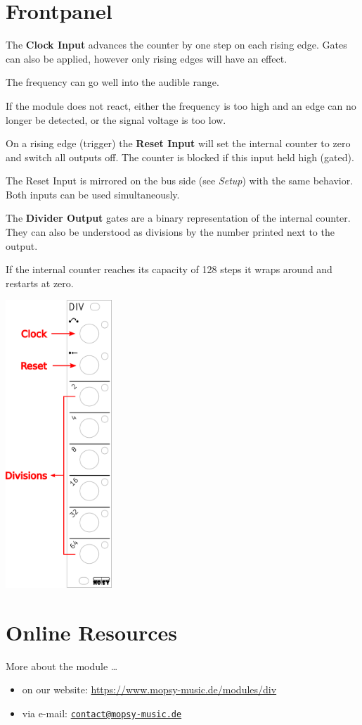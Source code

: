\documentclass[a4paper,
               11pt,
               parskip=half,
               headinclude,
               titlepage=false]{scrartcl}
\begin{document}
\begin{minipage}[]{10.5cm}
\setlength{\parskip}{\medskipamount}
\section*{Frontpanel}

The \textbf{\color{red}Clock Input} advances the counter by one step on each rising edge.
Gates can also be applied, however only rising edges will have an effect.

The frequency can go well into the audible range.

If the module does not react, either the frequency is too high and an edge can no longer be detected, or the signal voltage is too low.

\vspace{1em}

On a rising edge (trigger) the \textbf{\color{red}Reset Input} will set the internal counter to zero and switch all outputs off.
The counter is blocked if this input held high (gated).

The Reset Input is mirrored on the bus side (see \emph{Setup}) with the same behavior. Both inputs can be used simultaneously.%

\vspace{1em}

The \textbf{\color{red}Divider Output} gates are a binary representation of the internal counter. They can also be understood as divisions by the number printed next to the output.

If the internal counter reaches its capacity of 128 steps it wraps around and restarts at zero.

\end{minipage}%
\hspace{0.5cm}
\begin{minipage}[]{4cm}
\includegraphics[width=4cm]{div-frontpanel-labels}
\end{minipage}

\section*{Online Resources}

More about the module  …
\begin{itemize}[noitemsep]
 \item on our website: \url{https://www.mopsy-music.de/modules/div}
 \item via e-mail: \href{mailto:contact@mopsy-music.de}{\texttt{contact@mopsy-music.de}}
\end{itemize}
\end{document}
